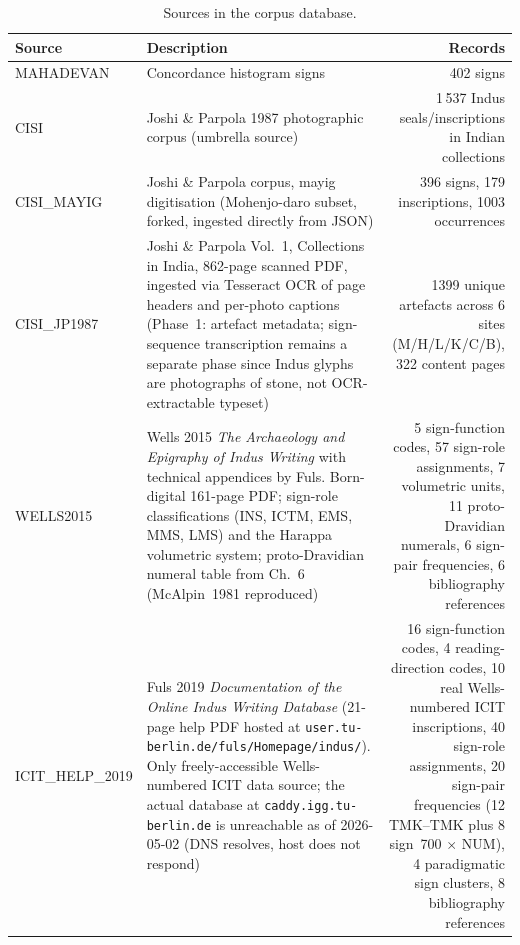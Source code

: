 \begin{longtable}{@{}llr@{}}
\caption{Sources in the corpus database.}
\label{tab:sources}\\
\toprule
Source & Description & Records \\
\midrule
\endfirsthead
\bottomrule
\endlastfoot
MAHADEVAN & Concordance histogram signs & \num{402} signs \\
\midrule
CISI & Joshi \& Parpola 1987 photographic
  corpus\smartcite{JoshiParpola1987} (umbrella source) & 1\,537 Indus seals/inscriptions
  in Indian collections \\
\midrule
CISI\_MAYIG & Joshi \& Parpola corpus,\smartcite{JoshiParpola1987} mayig
  digitisation\smartcite{MayigCISI} (Mohenjo-daro subset, forked, ingested
  directly from JSON)
     & \num{396} signs, \num{179} inscriptions, \num{1003} occurrences \\
\midrule
CISI\_JP1987 & Joshi \& Parpola Vol.~1, Collections in
  India,\smartcite{JoshiParpola1987} 862-page scanned PDF, ingested via
  Tesseract OCR of page headers and per-photo captions (Phase~1: artefact
  metadata; sign-sequence transcription remains a separate phase since
  Indus glyphs are photographs of stone, not OCR-extractable typeset)
     & \num{1399} unique artefacts across 6 sites (M/H/L/K/C/B), 322
       content pages \\
\midrule
WELLS2015 & Wells 2015 \textit{The Archaeology and Epigraphy of Indus
  Writing}\smartcite{Wells2015} with technical appendices by Fuls.
  Born-digital 161-page PDF; sign-role classifications (INS, ICTM, EMS,
  MMS, LMS) and the Harappa volumetric system; proto-Dravidian numeral
  table from Ch.~6 (McAlpin~1981 reproduced)
     & 5 sign-function codes, 57 sign-role assignments, 7 volumetric
       units, 11 proto-Dravidian numerals, 6 sign-pair frequencies,
       6 bibliography references \\
\midrule
ICIT\_HELP\_2019 & Fuls 2019 \textit{Documentation of the Online
  Indus Writing Database}\smartcite{WellsFuls2006} (21-page help PDF
  hosted at \texttt{user.tu-berlin.de/fuls/Homepage/indus/}). Only
  freely-accessible Wells-numbered ICIT data source; the actual
  database at \texttt{caddy.igg.tu-berlin.de} is unreachable as of
  2026-05-02 (DNS resolves, host does not respond)
     & 16 sign-function codes, 4 reading-direction codes, 10 real
       Wells-numbered ICIT inscriptions, 40 sign-role assignments,
       20 sign-pair frequencies (12 TMK--TMK plus 8 sign~700 $\times$
       NUM), 4 paradigmatic sign clusters, 8 bibliography
       references \\

\end{longtable}
